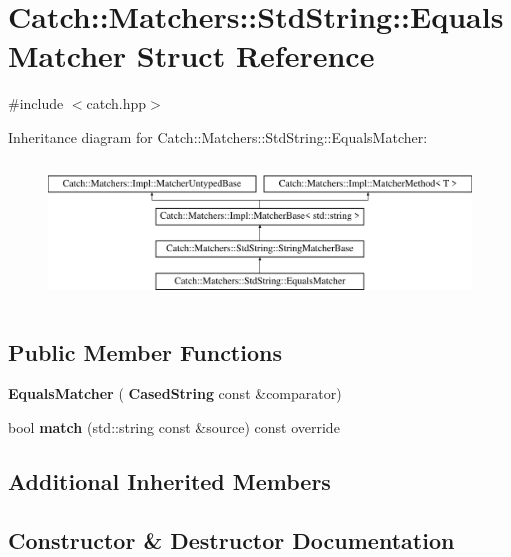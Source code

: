 \section{Catch\+::Matchers\+::Std\+String\+::Equals\+Matcher Struct Reference}
\label{struct_catch_1_1_matchers_1_1_std_string_1_1_equals_matcher}


{\ttfamily \#include $<$catch.\+hpp$>$}

Inheritance diagram for Catch\+::Matchers\+::Std\+String\+::Equals\+Matcher\+:\begin{figure}[H]
\begin{center}
\leavevmode
\includegraphics[height=3.758389cm]{struct_catch_1_1_matchers_1_1_std_string_1_1_equals_matcher}
\end{center}
\end{figure}
\subsection*{Public Member Functions}
\begin{DoxyCompactItemize}
\item 
\textbf{ Equals\+Matcher} (\textbf{ Cased\+String} const \&comparator)
\item 
bool \textbf{ match} (std\+::string const \&source) const override
\end{DoxyCompactItemize}
\subsection*{Additional Inherited Members}


\subsection{Constructor \& Destructor Documentation}
\mbox{\label{struct_catch_1_1_matchers_1_1_std_string_1_1_equals_matcher_ab740f1fb2310e9fe3fed5134d4c7e4c8}} 
